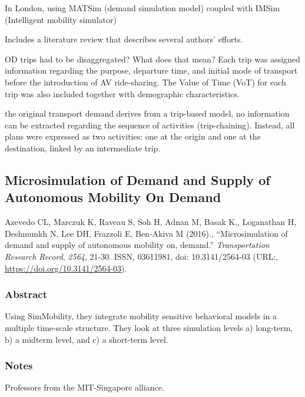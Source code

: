 \documentclass[]{article}
\begin{document}
In London, using MATSim (demand simulation model) coupled with IMSim
(Intelligent mobility simulator)

Includes a literature review that describes several authors' efforts.

OD trips had to be disaggregated? What does that mean? Each trip was
assigned information regarding the purpose, departure time, and initial
mode of transport before the introduction of AV ride-sharing. The Value
of Time (VoT) for each trip was also included together with demographic
characteristics.

the original transport demand derives from a trip-based model, no
information can be extracted regarding the sequence of activities
(trip-chaining). Instead, all plans were expressed as two activities:
one at the origin and one at the destination, linked by an intermediate
trip.

\hypertarget{microsimulation-of-demand-and-supply-of-autonomous-mobility-on-demand}{%
\subsection{Microsimulation of Demand and Supply of Autonomous Mobility
On
Demand}\label{microsimulation-of-demand-and-supply-of-autonomous-mobility-on-demand}}

Azevedo CL, Marczuk K, Raveau S, Soh H, Adnan M, Basak K,, Loganathan H,
Deshmunkh N, Lee DH, Frazzoli E, Ben-Akiva M (2016)., ``Microsimulation
of demand and supply of autonomous mobility on, demand.''
\emph{Transportation Research Record}, \emph{2564}, 21-30. ISSN,
03611981, doi: 10.3141/2564-03 (URL:,
\url{https://doi.org/10.3141/2564-03}).

\hypertarget{abstract-3}{%
\subsubsection{Abstract}\label{abstract-3}}

Using SimMobility, they integrate mobility sensitive behavioral models
in a multiple time-scale structure. They look at three simulation levels
a) long-term, b) a midterm level, and c) a short-term level.

\hypertarget{notes-3}{%
\subsubsection{Notes}\label{notes-3}}

Professors from the MIT-Singapore alliance.
\end{document}

